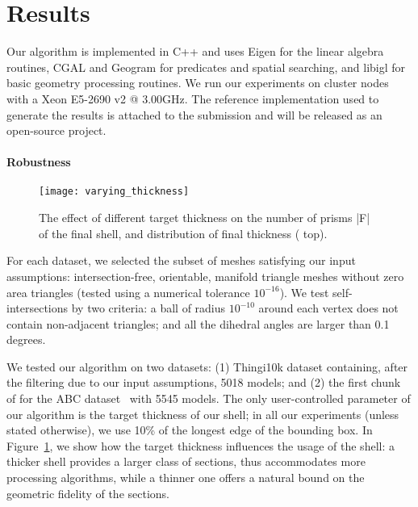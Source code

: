 \section{Results}
\label{sec:results}
Our algorithm is implemented in C++ and uses Eigen \cite{eigenweb} for the linear algebra routines, CGAL  and Geogram \cite{levy2015geogram} for predicates and spatial searching, and libigl \cite{jacobson2016libigl} for basic geometry processing routines.
We run our experiments on cluster nodes with a Xeon E5-2690 v2 @ 3.00GHz.
The reference implementation used to generate the results is attached to the submission and will be released as an open-source project.

\paragraph{Robustness}

\begin{figure}
    \centering
    \texttt{[image: varying\_thickness]}
    \caption{The effect of different target thickness on the number of prisms |F| of the final shell, 
    and distribution of final thickness ( top).} 
    
    \label{fig:vary_thick}
\end{figure}

For each dataset, we selected the subset of meshes satisfying our input assumptions:  intersection-free, orientable, manifold triangle meshes without zero area triangles (tested using a numerical tolerance $10^{-16}$).  We test self-intersections by two criteria: a ball of radius $10^{-10}$ around each vertex does not contain non-adjacent triangles; and all the dihedral angles are larger than 0.1 degrees.

We tested our algorithm on two datasets: (1) Thingi10k dataset \cite{zhou2016thingi10k} containing, after the filtering due to our input assumptions, 5018 models; and (2) the first chunk of for the ABC dataset~\cite{Koch_2019_CVPR} with 5545 models.
The only user-controlled parameter of our algorithm is the target thickness of our shell; in all our experiments (unless stated otherwise), we use 10\% of the longest edge of the bounding box. 
In Figure~\ref{fig:vary_thick}, we show how the target thickness influences the usage of the shell: a thicker shell provides a larger class of sections, thus accommodates more processing algorithms, while a thinner one offers a natural bound on the geometric fidelity of the sections.

